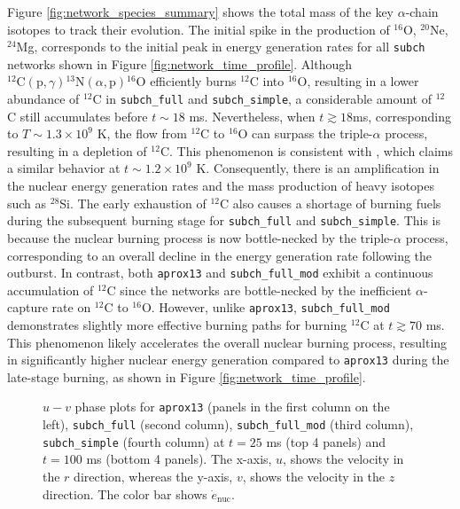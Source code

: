 \documentclass[preprint,times,tighten]{aastex631}
\begin{document}
Figure \ref{fig:network_species_summary} shows the total mass of the key $\alpha$-chain isotopes to track their evolution. The initial spike in the production of ${}^{16}$O, ${}^{20}$Ne, ${}^{24}$Mg, corresponds to the initial peak in energy generation rates for all {\tt subch} networks shown in Figure \ref{fig:network_time_profile}. Although ${}^{12}\mbox{C}(\mbox{p}, \gamma) {}^{13}\mbox{N}(\alpha, \mbox{p}){}^{16}\mbox{O}$ efficiently burns ${}^{12}$C into ${}^{16}$O, resulting in a lower abundance of ${}^{12}$C in {\tt subch\_full} and {\tt subch\_simple}, a considerable amount of ${}^{12}$C still accumulates before $t \sim 18$ ms. Nevertheless, when $t \gtrsim 18$ms, corresponding to $T \sim 1.3 \times 10^9$ K, the flow from ${}^{12}$C to ${}^{16}$O can surpass the triple-$\alpha$ process, resulting in a depletion of ${}^{12}$C. This phenomenon is consistent with \cite{Weinberg2007}, which claims a similar behavior at $t \sim 1.2 \times 10^9$ K. Consequently, there is an amplification in the nuclear energy generation rates and the mass production of heavy isotopes such as ${}^{28}$Si. The early exhaustion of ${}^{12}$C also causes a shortage of burning fuels during the subsequent burning stage for {\tt subch\_full} and {\tt subch\_simple}. This is because the nuclear burning process is now bottle-necked by the triple-$\alpha$ process, corresponding to an overall decline in the energy generation rate following the outburst. In contrast, both {\tt aprox13} and {\tt subch\_full\_mod} exhibit a continuous accumulation of ${}^{12}$C since the networks are bottle-necked by the inefficient $\alpha$-capture rate on ${}^{12}$C to ${}^{16}$O. However, unlike {\tt aprox13}, {\tt subch\_full\_mod} demonstrates slightly more effective burning paths for burning ${}^{12}$C at $t \gtrsim 70$ ms. This phenomenon likely accelerates the overall nuclear burning process, resulting in significantly higher nuclear energy generation compared to {\tt aprox13} during the late-stage burning, as shown in Figure \ref{fig:network_time_profile}.




\begin{figure*}
    \centering
    \caption{\label{fig:network_u_v_enuc} $u-v$ phase plots for {\tt aprox13} (panels in the first column on the left), {\tt subch\_full} (second column), {\tt subch\_full\_mod} (third column), {\tt subch\_simple} (fourth column) at $t = 25$ ms (top 4 panels) and $t = 100$ ms (bottom 4 panels). The x-axis, $u$, shows the velocity in the $r$ direction, whereas the y-axis, $v$, shows the velocity in the $z$ direction. The color bar shows $\dot{e}_{\textrm{nuc}}$.}
\end{figure*}
\end{document}
